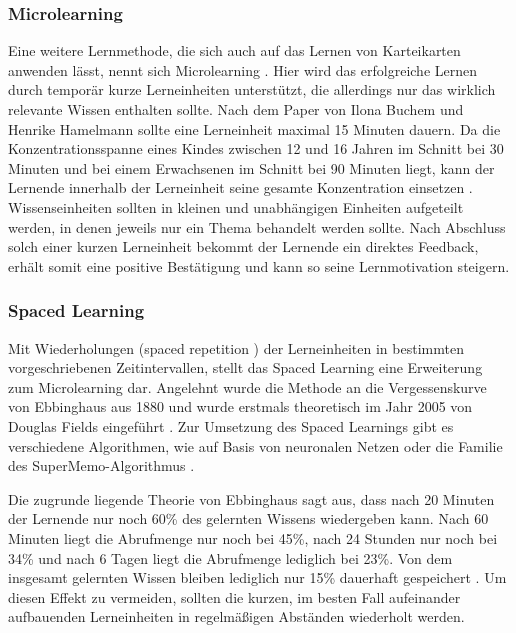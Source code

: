 \subsubsection{Microlearning}
Eine weitere Lernmethode, die sich auch auf das Lernen von Karteikarten anwenden lässt, nennt sich Microlearning \cite{Hug.2005}. Hier wird das erfolgreiche Lernen durch temporär kurze Lerneinheiten unterstützt, die allerdings nur das wirklich relevante Wissen enthalten sollte. Nach dem Paper von Ilona Buchem und Henrike Hamelmann \cite{Buchem.2010} sollte eine Lerneinheit maximal 15 Minuten dauern. Da die Konzentrationsspanne eines Kindes zwischen 12 und 16 Jahren im Schnitt bei 30 Minuten und bei einem Erwachsenen im Schnitt bei 90 Minuten liegt, kann der Lernende innerhalb der Lerneinheit seine gesamte Konzentration einsetzen \cite{konzentrationsspanne}. Wissenseinheiten sollten in kleinen und unabhängigen Einheiten aufgeteilt werden, in denen jeweils nur ein Thema behandelt werden sollte. Nach Abschluss solch einer kurzen Lerneinheit bekommt der Lernende ein direktes Feedback, erhält somit eine positive Bestätigung und kann so seine Lernmotivation steigern.


\subsubsection{Spaced Learning}
Mit Wiederholungen (\glqq spaced repetition \grqq{}) der Lerneinheiten in bestimmten vorgeschriebenen Zeitintervallen, stellt das Spaced Learning eine Erweiterung zum Microlearning dar. Angelehnt wurde die Methode an die Vergessenskurve von Ebbinghaus aus 1880 und wurde erstmals theoretisch im Jahr 2005 von Douglas Fields eingeführt \cite{Fields.2005}. Zur Umsetzung des Spaced Learnings gibt es verschiedene Algorithmen, wie auf Basis von neuronalen Netzen \cite{BartoszDregerPiotrWozniak.1998} oder die Familie des SuperMemo-Algorithmus \cite{supermemo}. 


Die zugrunde liegende Theorie von Ebbinghaus sagt aus, dass nach 20 Minuten der Lernende nur noch 60{\%} des gelernten Wissens wiedergeben kann. Nach 60 Minuten liegt die Abrufmenge nur noch bei 45{\%}, nach 24 Stunden nur noch bei 34{\%} und nach 6 Tagen liegt die Abrufmenge lediglich bei 23{\%}. Von dem insgesamt gelernten Wissen bleiben lediglich nur 15{\%} dauerhaft gespeichert \cite{Liss.2020}. Um diesen Effekt zu vermeiden, sollten die kurzen, im besten Fall aufeinander aufbauenden Lerneinheiten in regelmäßigen Abständen wiederholt werden. \\

